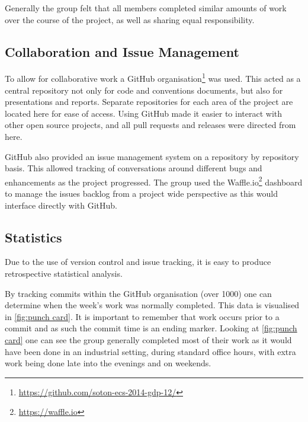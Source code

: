 Generally the group felt that all members completed similar amounts of work over the course of the project, as well as sharing equal responsibility.

\subsection{Collaboration and Issue Management}
To allow for collaborative work a GitHub organisation\footnote{\url{https://github.com/soton-ecs-2014-gdp-12/}} was used. This acted as a central repository not only for code and conventions documents, but also for presentations and reports. Separate repositories for each area of the project are located here for ease of access. Using GitHub made it easier to interact with other open source projects, and all pull requests and releases were directed from here.

GitHub also provided an issue management system on a repository by repository basis. This allowed tracking of conversations around different bugs and enhancements as the project progressed. The group used the Waffle.io\footnote{\url{https://waffle.io}} dashboard to manage the issues backlog from a project wide perspective as this would interface directly with GitHub.

\subsection{Statistics}

Due to the use of version control and issue tracking, it is easy to produce retrospective statistical analysis.

By tracking commits within the GitHub organisation (over 1000) one can determine when the week's work was normally completed. This data is visualised in \autoref{fig:punch card}. It is important to remember that work occurs prior to a commit and as such the commit time is an ending marker. Looking at \autoref{fig:punch card} one can see the group generally completed most of their work as it would have been done in an industrial setting, during standard office hours, with extra work being done late into the evenings and on weekends.

